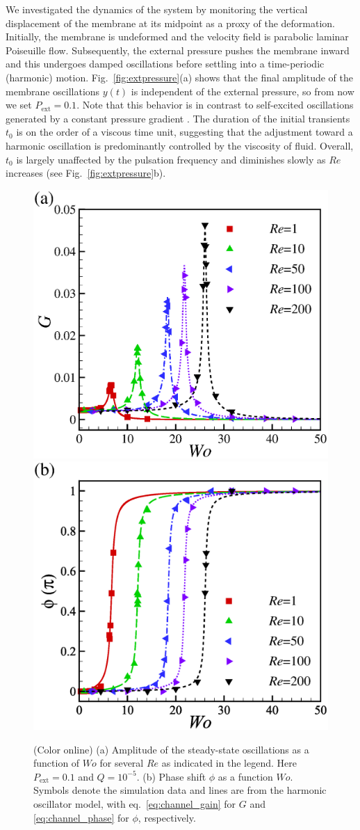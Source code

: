 \documentclass[aps,prl,reprint,superscriptaddress,floatfix]{revtex4-1}
\newcommand{\Rey}{\mathit{Re}}
\newcommand{\Wo}{\mathit{Wo}}
\begin{document}
We investigated the dynamics of the system by monitoring the vertical displacement of the membrane at its midpoint as a proxy of the deformation. Initially, the membrane is undeformed and the velocity field is parabolic laminar Poiseuille flow. Subsequently, the external pressure pushes the membrane inward and this undergoes damped oscillations before settling into a time-periodic (harmonic) motion. Fig.~\ref{fig:extpressure}(a) shows that the final amplitude of the membrane oscillations $y(t)$ is independent of the external pressure, so from now we set $P_\text{ext}=0.1$. Note that this behavior is in contrast to self-excited oscillations generated by a constant pressure gradient \cite{Tang15}. The duration of the initial transients $t_0$ is on the order 
of a viscous time unit, suggesting that the adjustment toward a harmonic oscillation is predominantly controlled by the viscosity of fluid. Overall, $t_0$ is largely unaffected by the pulsation frequency and diminishes slowly as $\Rey$ increases (see Fig.~\ref{fig:extpressure}b). 


\begin{figure}
\centering
\includegraphics[width=0.49\linewidth, trim={0.3cm 0cm 1.75cm 1cm}, clip]{./epsFig/fig3a.eps}	
\includegraphics[width=0.49\linewidth, trim={0.3cm 0cm 1.75cm 1cm}, clip]{./epsFig/fig3b.eps}
\caption{\label{fig:amplitude_phase}(Color online) (a) Amplitude of the steady-state oscillations as a function of $Wo$ for several $Re$ as indicated in the legend. Here  $P_\text{ext}=0.1$ and $Q=10^{-5}$. (b) Phase shift $\phi$ as a function $\Wo$. Symbols denote the simulation data and lines are from the harmonic oscillator model, with eq.~\eqref{eq:channel_gain} for $G$  and \eqref{eq:channel_phase} for $\phi$, respectively.}
\end{figure}
\end{document}
